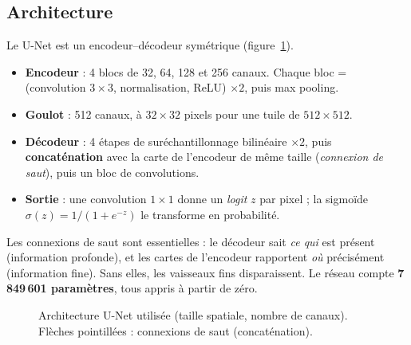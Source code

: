 \documentclass[11pt,a4paper]{article}
\begin{document}
\subsection{Architecture}
Le U-Net \cite{unet} est un encodeur--décodeur symétrique (figure~\ref{fig:unet}).
\begin{itemize}
  \item \textbf{Encodeur} : 4 blocs de 32, 64, 128 et 256 canaux. Chaque bloc = (convolution $3\times3$, normalisation, ReLU) $\times 2$, puis max pooling.
  \item \textbf{Goulot} : 512 canaux, à $32\times32$ pixels pour une tuile de $512\times512$.
  \item \textbf{Décodeur} : 4 étapes de suréchantillonnage bilinéaire $\times2$, puis \textbf{concaténation} avec la carte de l'encodeur de même taille (\emph{connexion de saut}), puis un bloc de convolutions.
  \item \textbf{Sortie} : une convolution $1\times1$ donne un \emph{logit} $z$ par pixel ; la sigmoïde $\sigma(z)=1/(1+e^{-z})$ le transforme en probabilité.
\end{itemize}
Les connexions de saut sont essentielles : le décodeur sait \emph{ce qui} est présent (information profonde), et les cartes de l'encodeur rapportent \emph{où} précisément (information fine). Sans elles, les vaisseaux fins disparaissent. Le réseau compte \textbf{7\,849\,601 paramètres}, tous appris à partir de zéro.

\begin{figure}[h]
\centering
{}
\caption{Architecture U-Net utilisée (taille spatiale, nombre de canaux). Flèches pointillées : connexions de saut (concaténation).}
\label{fig:unet}
\end{figure}
\end{document}
